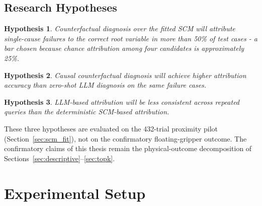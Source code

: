 \documentclass[11pt,a4paper]{report}
\newtheorem{hypothesis}{Hypothesis}[chapter]
\begin{document}
\section{Research Hypotheses}
\label{sec:hypotheses}

\begin{hypothesis}
  Counterfactual diagnosis over the fitted SCM will attribute single-cause failures to the correct root variable in more than 50\% of test cases - a bar chosen because chance attribution among four candidates is approximately 25\%.
  \label{hyp:accuracy}
\end{hypothesis}

\begin{hypothesis}
  Causal counterfactual diagnosis will achieve higher attribution accuracy than zero-shot LLM diagnosis on the same failure cases.
  \label{hyp:comparison}
\end{hypothesis}

\begin{hypothesis}
  LLM-based attribution will be less consistent across repeated queries than the deterministic SCM-based attribution.
  \label{hyp:consistency}
\end{hypothesis}

These three hypotheses are evaluated on the 432-trial proximity pilot (Section~\ref{sec:scm_fit}), not on the confirmatory floating-gripper outcome. The confirmatory claims of this thesis remain the physical-outcome decomposition of Sections~\ref{sec:descriptive}--\ref{sec:topk}.

\chapter{Experimental Setup}
\label{ch:method}
\label{ch:testbed}
\end{document}
